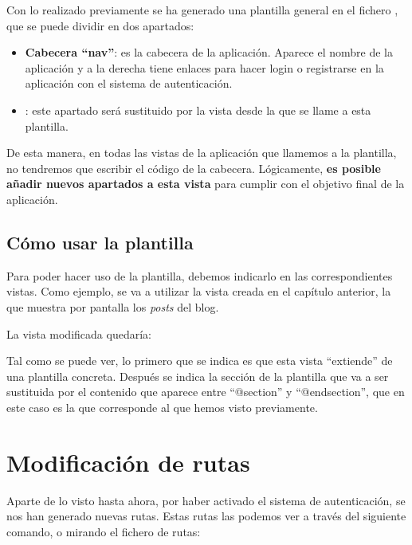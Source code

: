 Con lo realizado previamente se ha generado una plantilla general en el fichero , que se puede dividir en dos apartados:

\begin{itemize}
    \item \textbf{Cabecera “nav”}: es la cabecera de la aplicación. Aparece el nombre de la aplicación y a la derecha tiene enlaces para hacer login o registrarse en la aplicación con el sistema de autenticación.

    \item {}: este apartado será sustituido por la vista desde la que se llame a esta plantilla.
\end{itemize}

De esta manera, en todas las vistas de la aplicación que llamemos a la plantilla, no tendremos que escribir el código de la cabecera. Lógicamente, \textbf{es posible añadir nuevos apartados a esta vista} para cumplir con el objetivo final de la aplicación.

\section{Cómo usar la plantilla}

Para poder hacer uso de la plantilla, debemos indicarlo en las correspondientes vistas. Como ejemplo, se va a utilizar la vista creada en el capítulo anterior, la que muestra por pantalla los \textit{posts} del blog.

La vista modificada quedaría:


Tal como se puede ver, lo primero que se indica es que esta vista “extiende” de una plantilla concreta. Después se indica la sección de la plantilla que va a ser sustituida por el contenido que aparece entre “@section” y “@endsection”, que en este caso es la que corresponde al  que hemos visto previamente.


\chapter{Modificación de rutas}
Aparte de lo visto hasta ahora, por haber activado el sistema de autenticación, se nos han generado nuevas rutas. Estas rutas las podemos ver a través del siguiente comando, o mirando el fichero de rutas:

